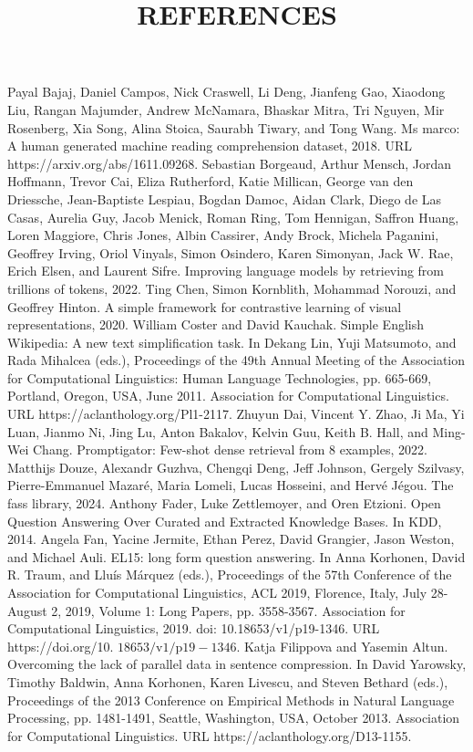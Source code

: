 \title{
REFERENCES
}
Payal Bajaj, Daniel Campos, Nick Craswell, Li Deng, Jianfeng Gao, Xiaodong Liu, Rangan Majumder, Andrew McNamara, Bhaskar Mitra, Tri Nguyen, Mir Rosenberg, Xia Song, Alina Stoica, Saurabh Tiwary, and Tong Wang. Ms marco: A human generated machine reading comprehension dataset, 2018. URL https://arxiv.org/abs/1611.09268.
Sebastian Borgeaud, Arthur Mensch, Jordan Hoffmann, Trevor Cai, Eliza Rutherford, Katie Millican, George van den Driessche, Jean-Baptiste Lespiau, Bogdan Damoc, Aidan Clark, Diego de Las Casas, Aurelia Guy, Jacob Menick, Roman Ring, Tom Hennigan, Saffron Huang, Loren Maggiore, Chris Jones, Albin Cassirer, Andy Brock, Michela Paganini, Geoffrey Irving, Oriol Vinyals, Simon Osindero, Karen Simonyan, Jack W. Rae, Erich Elsen, and Laurent Sifre. Improving language models by retrieving from trillions of tokens, 2022.
Ting Chen, Simon Kornblith, Mohammad Norouzi, and Geoffrey Hinton. A simple framework for contrastive learning of visual representations, 2020.
William Coster and David Kauchak. Simple English Wikipedia: A new text simplification task. In Dekang Lin, Yuji Matsumoto, and Rada Mihalcea (eds.), Proceedings of the 49th Annual Meeting of the Association for Computational Linguistics: Human Language Technologies, pp. 665-669, Portland, Oregon, USA, June 2011. Association for Computational Linguistics. URL https://aclanthology.org/Pl1-2117.
Zhuyun Dai, Vincent Y. Zhao, Ji Ma, Yi Luan, Jianmo Ni, Jing Lu, Anton Bakalov, Kelvin Guu, Keith B. Hall, and Ming-Wei Chang. Promptigator: Few-shot dense retrieval from 8 examples, 2022.
Matthijs Douze, Alexandr Guzhva, Chengqi Deng, Jeff Johnson, Gergely Szilvasy, Pierre-Emmanuel Mazaré, Maria Lomeli, Lucas Hosseini, and Hervé Jégou. The fass library, 2024.
Anthony Fader, Luke Zettlemoyer, and Oren Etzioni. Open Question Answering Over Curated and Extracted Knowledge Bases. In KDD, 2014.
Angela Fan, Yacine Jermite, Ethan Perez, David Grangier, Jason Weston, and Michael Auli. EL15: long form question answering. In Anna Korhonen, David R. Traum, and Lluís Márquez (eds.), Proceedings of the 57th Conference of the Association for Computational Linguistics, ACL 2019, Florence, Italy, July 28- August 2, 2019, Volume 1: Long Papers, pp. 3558-3567. Association for Computational Linguistics, 2019. doi: 10.18653/v1/p19-1346. URL https://doi.org/10. \(18653 / \mathrm{v1} / \mathrm{p} 19-1346\).
Katja Filippova and Yasemin Altun. Overcoming the lack of parallel data in sentence compression. In David Yarowsky, Timothy Baldwin, Anna Korhonen, Karen Livescu, and Steven Bethard (eds.), Proceedings of the 2013 Conference on Empirical Methods in Natural Language Processing, pp. 1481-1491, Seattle, Washington, USA, October 2013. Association for Computational Linguistics. URL https://aclanthology.org/D13-1155.
